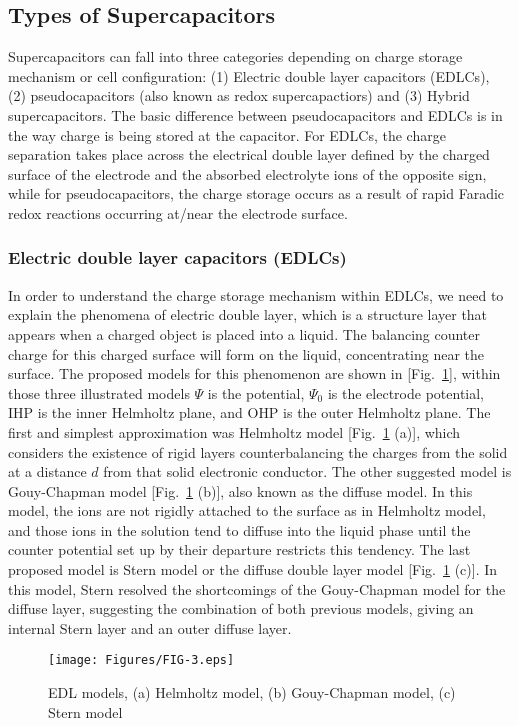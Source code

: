 \documentclass[reprint,amsmath,amssymb,aps,floatfix,
]{revtex4-2}
\begin{document}
\subsection{\label{sec:level3}Types of Supercapacitors}
Supercapacitors can fall into three categories depending on charge storage mechanism or cell configuration: (1) Electric double layer capacitors (EDLCs), (2) pseudocapacitors (also known as redox supercapactiors) and (3) Hybrid supercapacitors.\cite{González2016} The basic difference between pseudocapacitors and EDLCs is in the way charge is being stored at the capacitor. For EDLCs, the charge separation takes place across the electrical double layer defined by the charged surface of the electrode and the absorbed electrolyte ions of the opposite sign, while for pseudocapacitors, the charge storage occurs as a result of rapid Faradic redox reactions occurring at/near the electrode surface.\cite{Pandolfo2006}
\subsubsection{Electric double layer capacitors (EDLCs)}
In order to understand the charge storage mechanism within EDLCs, we need to explain the phenomena of electric double layer, which is a structure layer that appears when a charged object is placed into a liquid. The balancing counter charge for this charged surface will form on the liquid, concentrating near the surface.\cite{González2016} The proposed models for this phenomenon are shown in [Fig.~\ref{fig:fig3}], within those three illustrated models $\Psi$ is the potential, $\Psi_0$ is the electrode potential, IHP is the inner Helmholtz plane, and OHP is the outer Helmholtz plane. The first and simplest approximation was Helmholtz model [Fig.~\ref{fig:fig3} (a)], which considers the existence of rigid layers counterbalancing the charges from the solid at a distance $d$ from that solid electronic conductor.\cite{Pleskov2007} The other suggested model is Gouy-Chapman model [Fig.~\ref{fig:fig3} (b)], also known as the diffuse model. In this model, the ions are not rigidly attached to the surface as in Helmholtz model, and those ions in the solution tend to diffuse into the liquid phase until the counter potential set up by their departure restricts this tendency. The last proposed model is Stern model or the diffuse double layer model [Fig.~\ref{fig:fig3} (c)]. In this model, Stern resolved the shortcomings of the Gouy-Chapman model for the diffuse layer, suggesting the combination of both previous models, giving an internal Stern layer and an outer diffuse layer.\cite{Zhang2009}
\begin{figure}[t]
    \centering
    \texttt{[image: Figures/FIG-3.eps]}
    \caption{\label{fig:fig3} EDL models, (a) Helmholtz model, (b) Gouy-Chapman model, (c) Stern model}
    \end{figure}
\end{document}

